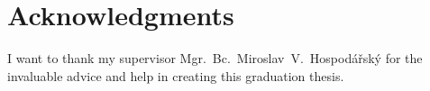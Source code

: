 ﻿\vfill

\section*{Acknowledgments}
I want to thank my supervisor Mgr.~Bc.~Miroslav~V.~Hospodářský  for the  invaluable advice and help in creating this graduation thesis.

\vglue 2cm $ $



